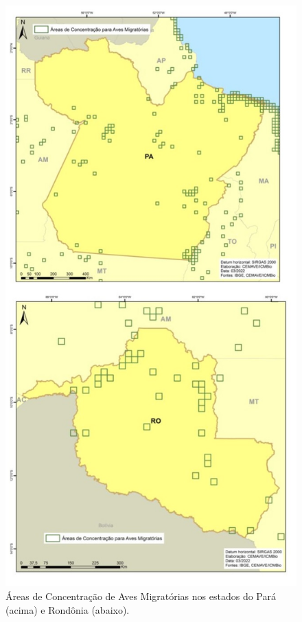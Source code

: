 \documentclass[
  oneside]{scrbook}
\begin{document}
\begin{figure}[H]

{\centering \includegraphics[width=0.7\linewidth]{imagens/cap07/Fig_17_PA_RO} 

}

\caption{Áreas de Concentração de Aves Migratórias nos estados do Pará (acima) e Rondônia (abaixo).}\label{fig:37}
\end{figure}
\end{document}
